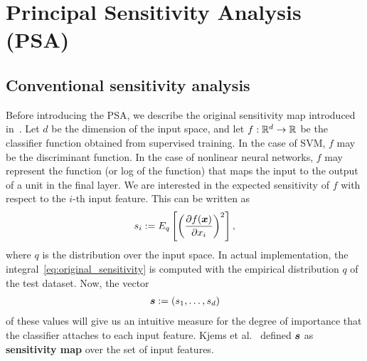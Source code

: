 \section{Principal Sensitivity Analysis (PSA)}
\label{sec:methods}
%
\subsection{Conventional sensitivity analysis}
%
Before introducing the PSA, we describe the original sensitivity map
introduced in~\cite{Kjems2002}.
%
Let $d$ be the dimension of the input space, and let
$f: \mathbb{R}^d \to \mathbb{R}$ be the classifier function obtained from supervised training.
%
In the case of SVM, $f$ may be the discriminant function.
%
In the case of nonlinear neural networks, $f$ may represent the function (or log of
the function) that maps the input to the output of a unit in the final layer.
%
We are interested in the expected sensitivity of $f$
with respect to the $i$-th input feature.
%
This can be written as
\begin{align}
\begin{split}
 \label{eq:original_sensitivity}
 s_i := E_q \left[ \left(\frac{\partial f(\mbox{\boldmath $x$})}{\partial x_i} \right)^2 \right],
\end{split}
\end{align}
%
where $q$ is the distribution over the input space.
%
In actual implementation, the integral~\eqref{eq:original_sensitivity} is
computed with the empirical distribution $q$ of the test dataset.
%
Now, the vector
\begin{align}
\begin{split}
\mbox{\boldmath $s$} := \left(s_1, \dots, s_d \right)
\end{split} \label{eq:classical_def}
\end{align}
of these values will give us an intuitive measure for the degree
of importance that the classifier attaches to each input feature.
Kjems et al.~\cite{Kjems2002} defined $\mbox{\boldmath $s$}$ as \textbf{sensitivity map} over the set
of input features.

